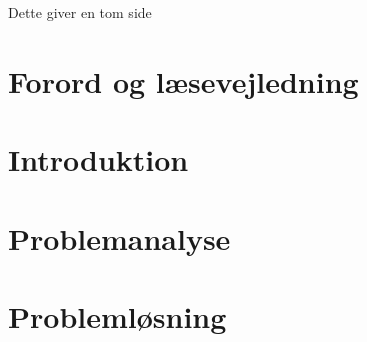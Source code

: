 



\frontmatter


\clearpage
\thispagestyle{empty}
{\color{white}Dette giver en tom side}
\clearpage

 \clearpage
\chapter*{Forord og læsevejledning}\vspace{-.75cm}

\newpage

\tableofcontents* 

\mainmatter

\chapter{Introduktion}\vspace{-.75cm}


\chapter{Problemanalyse}\vspace{-.75cm}









\chapter{Problemløsning}\vspace{-.75cm}















